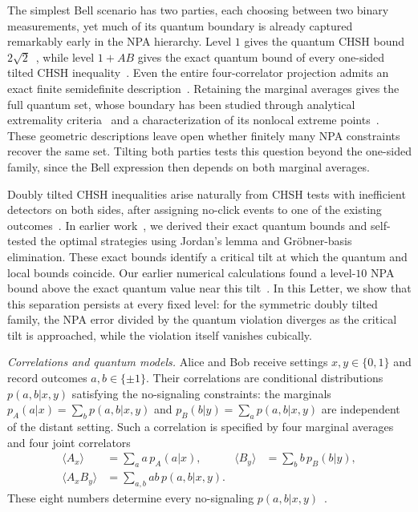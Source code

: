 \documentclass[aps,prl,twocolumn,10pt,superscriptaddress,nofootinbib,longbibliography,nobalancelastpage]{revtex4-2}
\begin{document}
The simplest Bell scenario has two parties, each choosing between two binary measurements, yet much of its quantum boundary is already captured remarkably early in the NPA hierarchy. Level $1$ gives the quantum CHSH bound $2\sqrt2$~\cite{CHSH1969,Tsirelson1980,NPA2007}, while level $1+AB$ gives the exact quantum bound of every one-sided tilted CHSH inequality~\cite{AMP2012,BampsPironio2015}. Even the entire four-correlator projection admits an exact finite semidefinite description~\cite{Landau1988,LeEtAl2023}. Retaining the marginal averages gives the full quantum set, whose boundary has been studied through analytical extremality criteria~\cite{MikosKaniewski2023,Ishizaka2025} and a characterization of its nonlocal extreme points~\cite{BarizienBancal2025}. These geometric descriptions leave open whether finitely many NPA constraints recover the same set. Tilting both parties tests this question beyond the one-sided family, since the Bell expression then depends on both marginal averages.

Doubly tilted CHSH inequalities arise naturally from CHSH tests with inefficient detectors on both sides, after assigning no-click events to one of the existing outcomes~\cite{MiklinEtAl2022,GigenaEtAl2025}. In earlier work~\cite{GigenaEtAl2025}, we derived their exact quantum bounds and self-tested the optimal strategies using Jordan's lemma and Gr\"obner-basis elimination. These exact bounds identify a critical tilt at which the quantum and local bounds coincide. Our earlier numerical calculations found a level-$10$ NPA bound above the exact quantum value near this tilt~\cite{GigenaEtAl2025}. In this Letter, we show that this separation persists at every fixed level: for the symmetric doubly tilted family, the NPA error divided by the quantum violation diverges as the critical tilt is approached, while the violation itself vanishes cubically.

\emph{Correlations and quantum models.} Alice and Bob receive settings $x,y\in\{0,1\}$ and record outcomes $a,b\in\{\pm1\}$. Their correlations are conditional distributions $p(a,b|x,y)$ satisfying the no-signaling constraints: the marginals $p_A(a|x)=\sum_b p(a,b|x,y)$ and $p_B(b|y)=\sum_a p(a,b|x,y)$ are independent of the distant setting. Such a correlation is specified by four marginal averages and four joint correlators
\begin{align}
\langle A_x\rangle&=\sum_a a\,p_A(a|x),&
\langle B_y\rangle&=\sum_b b\,p_B(b|y),\nonumber\\
\langle A_xB_y\rangle&=\sum_{a,b}ab\,p(a,b|x,y).
\label{eq:correlators}
\end{align}
These eight numbers determine every no-signaling $p(a,b|x,y)$~\cite{BrunnerEtAl2014}.
\end{document}
